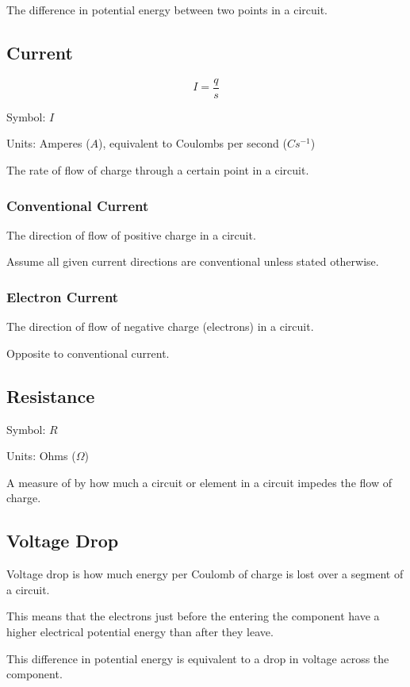 \documentclass[a4paper,11pt]{article}
\begin{document}
The difference in potential energy between two points in a circuit.


\subsection{Current}

$$
I = \frac{q}{s}
$$

Symbol: $I$

Units: Amperes ($A$), equivalent to Coulombs per second ($Cs^{-1}$)

The rate of flow of charge through a certain point in a circuit.


\subsubsection{Conventional Current}

The direction of flow of positive charge in a circuit.

Assume all given current directions are conventional unless stated otherwise.


\subsubsection{Electron Current}

The direction of flow of negative charge (electrons) in a circuit.

Opposite to conventional current.


\subsection{Resistance}

Symbol: $R$

Units: Ohms ($\Omega$)

A measure of by how much a circuit or element in a circuit impedes the flow of
charge.


\subsection{Voltage Drop}

Voltage drop is how much energy per Coulomb of charge is lost over a segment of
a circuit.

This means that the electrons just before the entering the component have a
higher electrical potential energy than after they leave.

This difference in potential energy is equivalent to a drop in voltage across
the component.
\end{document}
